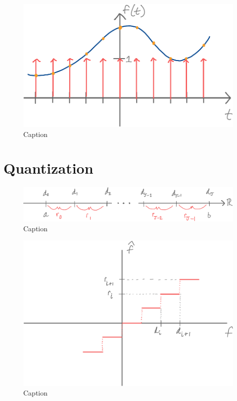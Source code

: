 \documentclass[11pt]{article}
\begin{document}
\begin{figure}
    \centering
    \includegraphics[width=\textwidth]{../figures/lecture01/sampling-an-arbitrary-function.pdf}
    \caption{Caption}
    \label{fig:sampling an arbitary function}
\end{figure}


\section{Quantization}


\begin{figure}
    \centering
    \includegraphics[width=\textwidth]{../figures/lecture01/quantization-ranges.pdf}
    \caption{Caption}
    \label{fig:sampling function}
\end{figure}

\begin{figure}
    \centering
    \includegraphics[width=\textwidth]{../figures/lecture01/quantization-transfer-function.pdf}
    \caption{Caption}
    \label{fig:sampling an arbitary function}
\end{figure}
\end{document}
